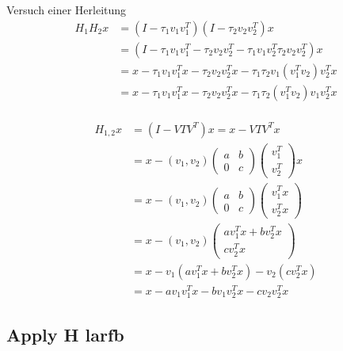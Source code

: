 Versuch einer Herleitung
\begin{align*}
	H_1 H_2 x &= (I-\tau_1 v_1 v_1^T)(I-\tau_2 v_2 v_2^T)x\\
	&= (I - \tau_1 v_1 v_1^T - \tau_2 v_2 v_2^T -  \tau_1 v_1 v_2^T \tau_2 v_2 v_2^T )x\\
  &= x - \tau_1 v_1 v_1^T x - \tau_2 v_2 v_2^T x - \tau_1 \tau_2 v_1 (v_1^T v_2 )v_2^T x\\
  &= x - \tau_1 v_1 v_1^T x - \tau_2 v_2 v_2^T x - \tau_1 \tau_2 (v_1^T v_2 ) v_1 v_2^T x\\
\end{align*}

\begin{align*}
  H_{1,2} x &= (I - V T V^T) x = x - V T V^T x\\
  &= x - (v_1, v_2)
  \begin{pmatrix}
    a & b \\ 0 & c
  \end{pmatrix}
  \begin{pmatrix}
    v_1^T \\ v_2^T 
  \end{pmatrix}
  x\\
  &= x - (v_1, v_2)
  \begin{pmatrix}
    a & b \\ 0 & c
  \end{pmatrix}
  \begin{pmatrix}
    v_1^T x \\ v_2^T x
  \end{pmatrix}\\
  &= x - (v_1, v_2)
  \begin{pmatrix}
    a v_1^T x + b v_2^T x\\  c v_2^T x
  \end{pmatrix}\\
  &= x - v_1(a v_1^T x + b v_2^T x) - v_2 (c v_2^T x)\\
  &= x - a v_1 v_1^T x - b v_1 v_2^T x - c v_2 v_2^T x
\end{align*}

\subsection{Apply H larfb}

